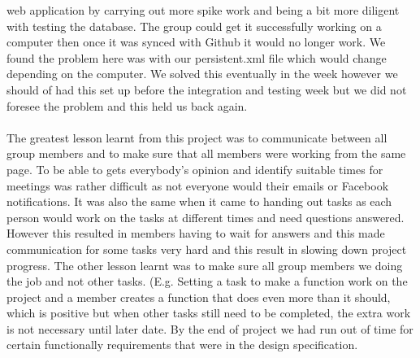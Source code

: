 \documentclass[titlepage]{article}
\begin{document}
{web application by carrying out more spike work and being a bit more diligent with testing the
database. The group could get it successfully working on a computer then once it was synced with Github it would no
longer work. We found the problem here was with our persistent.xml file which would
change depending on the computer. We solved this eventually in the week however we should of had
this set up before the integration and testing week but we did not foresee the problem and
this held us back again.
\\
\\
The greatest lesson learnt from this project was to communicate between all group members and to make sure that all members
were working from the same page. To be able to gets everybody's opinion and identify suitable times for meetings was rather difficult as not everyone would their
emails or Facebook notifications. It was also the same when it came to handing out tasks as each
person would work on the tasks at different times and need questions answered. However this resulted in members having to
wait for answers and this made communication for some tasks very hard and this result in slowing down project progress. The other lesson learnt was to make sure all group members we doing the job and not other tasks. (E.g. Setting a task to make a function work on the project and a member creates a function that does even more than it should, which is positive but when other tasks still need to be completed, the extra work is not necessary until later date. By the end of project we had run out of time for certain functionally requirements that were in the design specification.
\\
\\
\newpage
}
\end{document}
